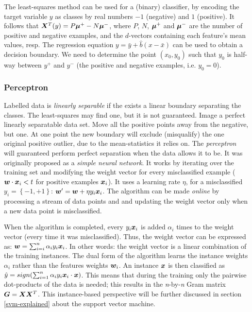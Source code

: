 The least-squares method can be used for a (binary) classifier, by encoding the target variable $y$ as classes by real numbers $-1$ (negative) and $1$ (positive).
It follows that $\matrixsym{X}^T\vectorsym(y) = P \vectorsym{\mu^+} - N \vectorsym{\mu^-}$, where $P$, $N$, $\vectorsym{\mu^+}$ and $\vectorsym{\mu^-}$ are the number of positive and negative examples, and the $d$-vectors containing each feature's mean values, resp.
The regression equation $y = \bar{y} + \hat{b}(x - \bar{x})$ can be used to obtain a decision boundary.
We need to determine the point $(x_0, y_0)$ such that $y_0$ is half-way between $y^+$ and $y^-$ (the positive and negative examples, i.e. $y_0 = 0$).


\subsubsection{Perceptron}\label{perceptron}
Labelled data is \emph{linearly separable} if the exists a linear boundary separating the classes.
The least-squares may find one, but it is not guaranteed.
Image a perfect linearly separatable data set.
Move all the positive points away from the negative, but one.
At one point the new boundary will exclude (misqualify) the one original positive outlier, due to the mean-statistics it relies on.
The \emph{perceptron} will guaranteed perform perfect separation when the data allows it to be.
It was originally proposed as a \emph{simple neural network}.
It works by iterating over the training set and modifying the weight vector for every misclassified example ($\vectorsym{w} \cdot \vectorsym{x}_i < t$ for positive examples $\vectorsym{x}_i$).
It uses a learning rate $\eta$, for a misclassified $y_i = \left\{-1,+1\right\}$: $\vectorsym{w}' = \vectorsym{w} + \eta y_i \vectorsym{x}_i$.
The algorithm can be made \emph{online} by processing a stream of data points and and updating the weight vector only when a new data point is misclassified.

When the algorithm is completed, every $y_i\vectorsym{x}_i$ is added $\alpha_i$ times to the weight vector (every time it was misclassified).
Thus, the weight vector can be expressed as: $\vectorsym{w} = \sum_{i=i}^n \alpha_i y_i \vectorsym{x}_i$.
In other words: the weight vector is a linear combination of the training instances.
The dual form of the algorithm learns the instance weights $\alpha_i$ rather than the features weights $\vectorsym{w}_i$.
An instance $\vectorsym{x}$ is then classified as $\hat{y} = sign(\sum_{i=1}^n \alpha_i y_i \vectorsym{x}_i \cdot \vectorsym{x})$.
This means that during the training only the pairwise dot-products of the data is needed; this results in the \emph{n}-by-\emph{n} Gram matrix $\matrixsym{G} = \matrixsym{X}\matrixsym{X}^T$.
This instance-based perspective will be further discussed in section \ref{svm-explained} about the support vector machine.


